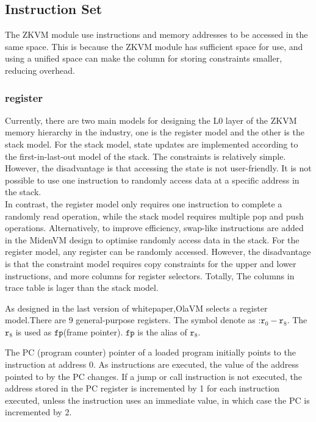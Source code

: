 \subsection{Instruction Set}\label{subsec: instructions-set}

The ZKVM module use instructions and memory addresses to be accessed in the same space.
This is because the ZKVM module has sufficient space for use,
and using a unified space can make the column for storing constraints smaller, reducing overhead.

\subsubsection{register}\label{subsec: zkvm-executor-register}
    Currently, there are two main models for designing the L0 layer of the ZKVM memory hierarchy in the industry, one is the register model and the other is the stack model.
    For the stack model, state updates are implemented according to the first-in-last-out model of the stack. The constraints is relatively simple.
However, the disadvantage is that accessing the state is not user-friendly.
It is not possible to use one instruction to randomly access data at a specific address in the stack. \\
    In contrast, the register model only requires one instruction to complete a randomly read operation, while the stack model requires multiple pop and push operations.
Alternatively, to improve efficiency, swap-like instructions are added in the MidenVM design to optimise randomly access data in the stack.
    For the register model, any register can be randomly accessed.
    However, the disadvantage is that the constraint model requires copy constraints for the upper and lower instructions, and more columns for register selectors.
    Totally, The columns in trace table is lager than the stack model.

    As designed in the last version of whitepaper,OlaVM selects a register model.There are 9 general-purpose registers.
The symbol denote as :$\texttt{r}_0 - \texttt{r}_{8}$.
The $\texttt{r}_{8}$ is used as $\texttt{fp}$(frame pointer). $\texttt{fp}$ is the alias of $\texttt{r}_{8}$.

The PC (program counter) pointer of a loaded program initially points to the instruction at address 0.
As instructions are executed, the value of the address pointed to by the PC changes.
If a jump or call instruction is not executed, the address stored in the PC register is incremented by 1 for each instruction executed, unless the instruction uses an immediate value, in which case the PC is incremented by 2.

